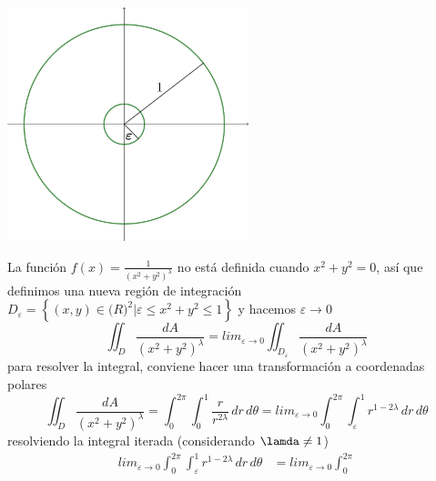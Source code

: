 \documentclass{article}
\begin{document}
\begin{enumerate}
{            \color{azul}
            \begin{center}
                \includegraphics[width=7cm]{img/ej7.png}
            \end{center}
            La función $\displaystyle f(x)=\frac{1}{(x^2+y^2)^\lambda}$ no está
            definida cuando $x^2+y^2=0$, así que definimos una nueva región de
            integración $D_\varepsilon = \left\{(x,y)\in\mathbb(R)^2 |
            \varepsilon\leq x^2+y^2\leq 1\right\}$ y hacemos $\varepsilon
            \rightarrow 0$
            \[
                \iint_D {\frac{dA}{\left(x^2+y^2\right)^\lambda}}
                =lim_{\varepsilon\rightarrow 0}{
                    \iint_{D_\varepsilon}{
                        \frac{dA}{\left(x^2+y^2\right)^\lambda}
                    }
                }
            \]
            para resolver la integral, conviene hacer una transformación a
            coordenadas polares
            \[
                \iint_D {\frac{dA}{\left(x^2+y^2\right)^\lambda}}
                =\int_{0}^{2\pi}{
                    \int_{0}^{1}{
                        \frac{r}{r^{2\lambda}}
                    \,dr}
                \,d\theta}
                =lim_{\varepsilon\rightarrow 0}{
                    \int_{0}^{2\pi}{
                        \int_{\varepsilon}^{1}{
                            r^{1-2\lambda}
                        \,dr}
                    \,d\theta}
                }
            \]
            resolviendo la integral iterada (considerando $\lamda\ne 1$)
            \begin{eqnarray*}
                lim_{\varepsilon\rightarrow 0}{
                    \int_{0}^{2\pi}{
                        \int_{\varepsilon}^{1}{
                            r^{1-2\lambda}
                        \,dr}
                    \,d\theta}
                }
                &=lim_{\varepsilon\rightarrow 0}{
                    \int_{0}^{2\pi}{
}}
\end{eqnarray*}}
\end{enumerate}
\end{document}
